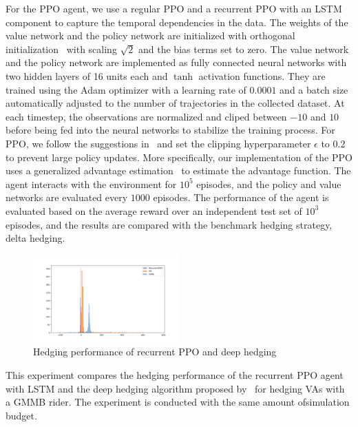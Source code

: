 For the PPO agent, we use a regular PPO and a recurrent PPO with an LSTM component to capture the temporal dependencies in the data.
The weights of the value network and the policy network are initialized with orthogonal initialization~\citep{engstrom2020implementation} with scaling $\sqrt{2}$ and the bias terms set to zero.
The value network and the policy network are implemented as fully connected neural networks with two hidden layers of 16 units each and $\tanh$ activation functions.
They are trained using the Adam optimizer with a learning rate of $0.0001$ and a batch size automatically adjusted to the number of trajectories in the collected dataset.
At each timestep, the observations are normalized and cliped between $-10$ and $10$ before being fed into the neural networks to stabilize the training process.
For PPO, we follow the suggestions in~\cite{schulman2017proximal} and set the clipping hyperparameter $\epsilon$ to $0.2$ to prevent large policy updates. 
More specifically, our implementation of the PPO uses a generalized advantage estimation~\citep{schulman2015high} to estimate the advantage function.
The agent interacts with the environment for $10^5$ episodes, and the policy and value networks are evaluated every $1000$ episodes.
The performance of the agent is evaluated based on the average reward over an independent test set of $10^3$ episodes, and the results are compared with the benchmark hedging strategy, delta hedging.

\begin{figure}[ht!]
    \centering
    \includegraphics[width=0.5\textwidth]{./futureWork/figures/PPO_DH.png}
    \caption{Hedging performance of recurrent PPO and deep hedging}
    \label{fig3:ppo_dh}
\end{figure}

This experiment compares the hedging performance of the recurrent PPO agent with LSTM and the deep hedging algorithm proposed by~\cite{buehler2019deep} for hedging VAs with a GMMB rider.
The experiment is conducted with the same amount ofsimulation budget.

